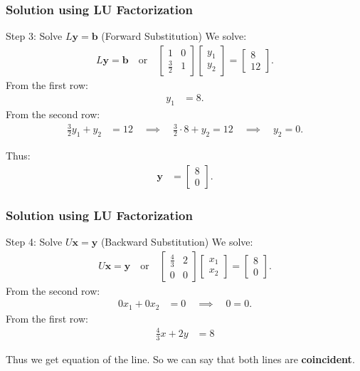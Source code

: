\documentclass{beamer}
\theoremstyle{remark}
\numberwithin{equation}{section}
\begin{document}
\begin{frame}
\frametitle{Solution using LU Factorization}
Step 3: Solve $L\mathbf{y} = \mathbf{b}$ (Forward Substitution)
	We solve:
	\begin{align}
		L\mathbf{y} = \mathbf{b} \quad \text{or} \quad \begin{bmatrix} 1 & 0 \\ \frac{3}{2} & 1 \end{bmatrix} \begin{bmatrix} y_1 \\ y_2 \end{bmatrix} = \begin{bmatrix} 8 \\ 12 \end{bmatrix}.
	\end{align}
	From the first row:
	\begin{align}
		y_1 &= 8.
	\end{align}
	From the second row:
	\begin{align}
		\frac{3}{2} y_1 + y_2 &= 12 \quad \implies \quad \frac{3}{2} \cdot 8 + y_2 = 12 \quad \implies \quad y_2 = 0.
	\end{align}
	
	Thus:
	\begin{align}
		\mathbf{y} &= \begin{bmatrix} 8 \\ 0 \end{bmatrix}.
	\end{align}

	

\end{frame}

\begin{frame}
\frametitle{Solution using LU Factorization}
Step 4: Solve $U\mathbf{x} = \mathbf{y}$ (Backward Substitution)
	We solve:
	\begin{align}
		U\mathbf{x} = \mathbf{y} \quad \text{or} \quad \begin{bmatrix} \frac{4}{3} & 2 \\ 0 & 0 \end{bmatrix} \begin{bmatrix} x_1 \\ x_2 \end{bmatrix} = \begin{bmatrix} 8 \\ 0 \end{bmatrix}.
	\end{align}
	From the second row:
	\begin{align}
		0x_1+0x_2 &= 0 \quad \implies \quad 0=0.
	\end{align}
	From the first row:
	\begin{align}
		\frac{4}{3}x + 2y &= 8
	\end{align}
	
	Thus we get equation of the line. So we can say that both lines are \textbf{coincident}.
	
	
	

\end{frame}
\end{document}
